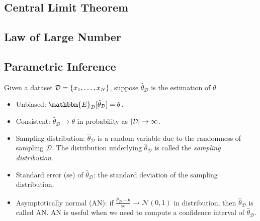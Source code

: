     
    \subsection{Central Limit Theorem}
    
    \subsection{Law of Large Number}
     
     

\subsection{Parametric Inference}
    Given a dataset $\mathcal{D} = \{ x_1, \ldots, x_N \}$, suppose $\hat{\theta}_{\mathcal{D}}$ is the estimation of $\theta$.
    \begin{itemize}
        \item Unbiased: $\mathbbm{E}_{\mathcal{D}}[\hat{\theta}_\mathcal{D} ] = \theta$.
        \item Consistent: $\hat{\theta}_\mathcal{D} \rightarrow \theta$ in probability as $| \mathcal{D} | \rightarrow \infty$.
        \item Sampling distribution: $\hat{\theta}_\mathcal{D}$ is a random variable due to the randomness of sampling $\mathcal{D}$.
        The distribution underlying $\hat{\theta}_\mathcal{D}$ is called the \emph{sampling distribution}.
        \item Standard error (se) of $\hat{\theta}_\mathcal{D}$: the standard deviation of the sampling distribution.
        \item Asymptotically normal (AN): if $\frac{\hat{\theta}_\mathcal{D} - \theta}{\text{se}} \rightarrow \mathcal{N}(0, 1)$ in distribution, then $\hat{\theta}_\mathcal{D}$ is called AN.
        AN is useful when we need to compute a confidence interval of $\hat{\theta}_\mathcal{D}$.
    \end{itemize}

